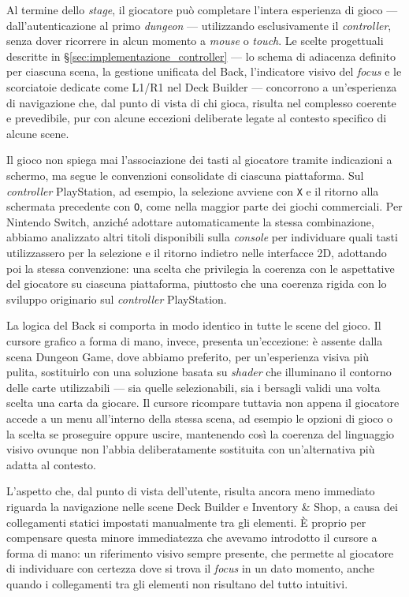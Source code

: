 Al termine dello \textit{stage}, il giocatore può completare l'intera esperienza di gioco — dall'autenticazione al primo \textit{dungeon} — utilizzando esclusivamente il \textit{controller}, senza dover ricorrere in alcun momento a \textit{mouse} o \textit{touch}. Le scelte progettuali descritte in \S\ref{sec:implementazione_controller} — lo schema di adiacenza definito per ciascuna scena, la gestione unificata del Back, l'indicatore visivo del \textit{focus} e le scorciatoie dedicate come L1/R1 nel Deck Builder — concorrono a un'esperienza di navigazione che, dal punto di vista di chi gioca, risulta nel complesso coerente e prevedibile, pur con alcune eccezioni deliberate legate al contesto specifico di alcune scene.
 
Il gioco non spiega mai l'associazione dei tasti al giocatore tramite indicazioni a schermo, ma segue le convenzioni consolidate di ciascuna piattaforma. Sul \textit{controller} PlayStation, ad esempio, la selezione avviene con \texttt{X} e il ritorno alla schermata precedente con \texttt{O}, come nella maggior parte dei giochi commerciali. Per Nintendo Switch, anziché adottare automaticamente la stessa combinazione, abbiamo analizzato altri titoli disponibili sulla \textit{console} per individuare quali tasti utilizzassero per la selezione e il ritorno indietro nelle interfacce 2D, adottando poi la stessa convenzione: una scelta che privilegia la coerenza con le aspettative del giocatore su ciascuna piattaforma, piuttosto che una coerenza rigida con lo sviluppo originario sul \textit{controller} PlayStation.
 
La logica del Back si comporta in modo identico in tutte le scene del gioco. Il cursore grafico a forma di mano, invece, presenta un'eccezione: è assente dalla scena Dungeon Game, dove abbiamo preferito, per un'esperienza visiva più pulita, sostituirlo con una soluzione basata su \textit{shader} che illuminano il contorno delle carte utilizzabili — sia quelle selezionabili, sia i bersagli validi una volta scelta una carta da giocare. Il cursore ricompare tuttavia non appena il giocatore accede a un menu all'interno della stessa scena, ad esempio le opzioni di gioco o la scelta se proseguire oppure uscire, mantenendo così la coerenza del linguaggio visivo ovunque non l'abbia deliberatamente sostituita con un'alternativa più adatta al contesto.
 
L'aspetto che, dal punto di vista dell'utente, risulta ancora meno immediato riguarda la navigazione nelle scene Deck Builder e Inventory \& Shop, a causa dei collegamenti statici impostati manualmente tra gli elementi. È proprio per compensare questa minore immediatezza che avevamo introdotto il cursore a forma di mano: un riferimento visivo sempre presente, che permette al giocatore di individuare con certezza dove si trova il \textit{focus} in un dato momento, anche quando i collegamenti tra gli elementi non risultano del tutto intuitivi.

